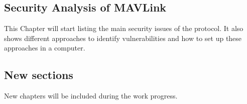 \subsection{Security Analysis of MAVLink}
	This Chapter will start listing the main security issues of the protocol. It also shows different approaches to identify vulnerabilities and how to set up these approaches in a computer.
    
\subsection{New sections}
	New chapters will be included during the work progress. 